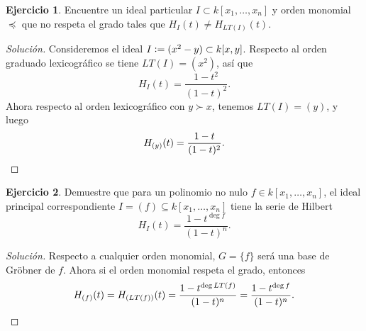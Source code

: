 \documentclass{article}
\theoremstyle{definition}
\newtheorem{ejerc}{Ejercicio}
\newenvironment{solucion}{\begin{proof}[Solución]}{\end{proof}}
\begin{document}
\begin{ejerc}
  Encuentre un ideal particular $I \subset k [x_1,\ldots,x_n]$ y orden monomial
  $\preceq$ que no respeta el grado tales que $H_I (t) \ne H_{LT (I)} (t)$.

  \ifdefined\solutions\begin{solucion}
    Consideremos el ideal $I \mathrel{\mathop:}= (x^2-y) \subset k [x,y]$. Respecto al orden
    graduado lexicográfico se tiene $LT (I) = (x^2)$, así que
    $$H_I (t) = \frac{1 - t^2}{(1-t)^2}.$$
    Ahora respecto al orden lexicográfico con $y \succ x$, tenemos
    $LT (I) = (y)$, y luego
    \[ H_{(y)} (t) = \frac{1-t}{(1-t)^2}. \qedhere \]
  \end{solucion}\fi
\end{ejerc}

\begin{ejerc}
  Demuestre que para un polinomio no nulo $f \in k [x_1,\ldots,x_n]$, el ideal
  principal correspondiente $I = (f) \subseteq k [x_1,\ldots,x_n]$ tiene la
  serie de Hilbert
  $$H_I (t) = \frac{1 - t^{\deg f}}{(1-t)^n}.$$

  \ifdefined\solutions\begin{solucion}
    Respecto a cualquier orden monomial, $G = \{ f \}$ será una base de Gröbner
    de $f$. Ahora si el orden monomial respeta el grado, entonces
    \[ H_{(f)} (t) = H_{(LT (f))} (t) =
       \frac{1 - t^{\deg LT (f)}}{(1-t)^n} =
       \frac{1 - t^{\deg f}}{(1-t)^n}. \qedhere \]
  \end{solucion}\fi
\end{ejerc}
\end{document}
